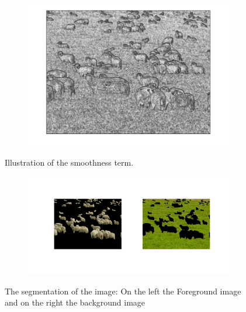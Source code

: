 \documentclass{paper}
\begin{document}
\begin{figure}[H]
    \centering
    \begin{subfigure}{1.0\textwidth}
        \includegraphics[width=\textwidth]{../../outputs/p4/image_segmentation/sheeps/smoothness}
    \end{subfigure}
    \caption{Illustration of the smoothness term.}
    \label{fig:segmentation_sheeps_smoothness}       
\end{figure}

\begin{figure}[H]
    \centering
    \begin{subfigure}{1.0\textwidth}
        \includegraphics[width=\textwidth]{../../outputs/p4/image_segmentation/sheeps/segmentation}
    \end{subfigure}
    \caption{The segmentation of the image: On the left the Foreground image and on the right the background image}
    \label{fig:segmentation_sheeps_segmenation}       
\end{figure}
\end{document}
